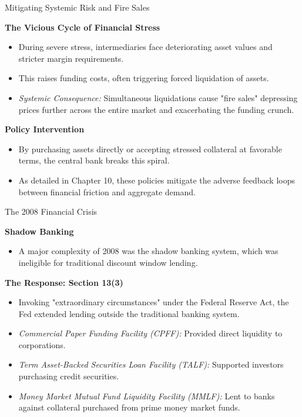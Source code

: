\documentclass[11pt,aspectratio=169]{beamer}
\begin{document}
\begin{frame}{Mitigating Systemic Risk and Fire Sales}
\small

\textbf{The Vicious Cycle of Financial Stress}
\begin{itemize}
    \item During severe stress, intermediaries face deteriorating asset values and stricter margin requirements.
    \item This raises funding costs, often triggering forced liquidation of assets.
    \item \textit{Systemic Consequence:} Simultaneous liquidations cause "fire sales" depressing prices further across the entire market and exacerbating the funding crunch.
\end{itemize}

\vspace{0.4cm}

\textbf{Policy Intervention}
\begin{itemize}
    \item By purchasing assets directly or accepting stressed collateral at favorable terms, the central bank  breaks this spiral.
    \item As detailed in Chapter 10, these policies mitigate the adverse feedback loops between financial friction and aggregate demand.
\end{itemize}

\end{frame}

\begin{frame}{The 2008 Financial Crisis}
\small

\textbf{Shadow Banking}
\begin{itemize}
    \item A major complexity of 2008 was the shadow banking system, which was ineligible for traditional discount window lending.
\end{itemize}

\vspace{0.3cm}

\textbf{The Response: Section 13(3)}
\begin{itemize}
    \item Invoking "extraordinary circumstances" under the Federal Reserve Act, the Fed extended lending outside the traditional banking system.
    \item \textit{Commercial Paper Funding Facility (CPFF):} Provided direct liquidity to corporations.
    \item \textit{Term Asset-Backed Securities Loan Facility (TALF):} Supported investors purchasing credit securities.
    \item \textit{Money Market Mutual Fund Liquidity Facility (MMLF):} Lent to banks against collateral purchased from prime money market funds.
\end{itemize}

\end{frame}
\end{document}
